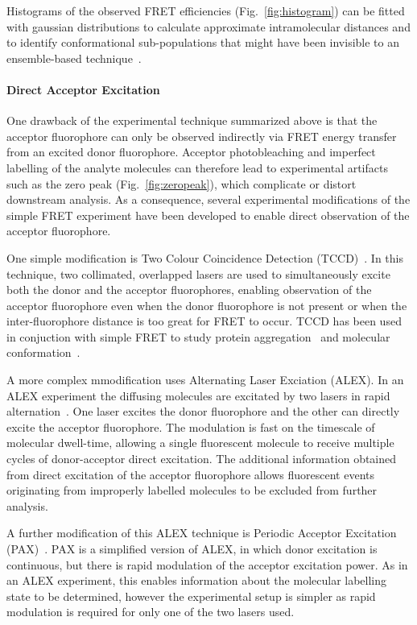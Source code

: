 Histograms of the observed FRET efficiencies (Fig.~\ref{fig:histogram}) can be fitted with gaussian distributions to calculate approximate intramolecular distances and to identify conformational sub-populations that might have been invisible to an ensemble-based technique~\cite{joo08, Walter2008}.

\paragraph{Direct Acceptor Excitation}
One drawback of the experimental technique summarized above is that the acceptor fluorophore can only be observed indirectly via FRET energy transfer from an excited donor fluorophore. Acceptor photobleaching and imperfect labelling of the analyte molecules can therefore lead to experimental artifacts such as the zero peak (Fig.~\ref{fig:zeropeak}), which complicate or distort downstream analysis. As a consequence, several experimental modifications of the simple FRET experiment have been developed to enable direct observation of the acceptor fluorophore.

One simple modification is Two Colour Coincidence Detection (TCCD)~\cite{orte06, orte10}. In this technique, two collimated, overlapped lasers are used to simultaneously excite both the donor and the acceptor fluorophores, enabling observation of the acceptor fluorophore even when the donor fluorophore is not present or when the inter-fluorophore distance is too great for FRET to occur. TCCD has been used in conjuction with simple FRET to study protein aggregation~\cite{cremades2012} and molecular conformation~\cite{Ye2012}.  

A more complex mmodification uses Alternating Laser Exciation (ALEX). In an ALEX experiment the diffusing molecules are excitated by two lasers in rapid alternation~\cite{kapanidis05}. One laser excites the donor fluorophore and the other can directly excite the acceptor fluorophore. The modulation is fast on the timescale of molecular dwell-time, allowing a single fluorescent molecule to receive multiple cycles of donor-acceptor direct excitation. The additional information obtained from direct excitation of the acceptor fluorophore allows fluorescent events originating from improperly labelled molecules to be excluded from further analysis. 

A further modification of this ALEX technique is Periodic Acceptor Excitation (PAX)~\cite{doose07}. PAX is a simplified version of ALEX, in which donor excitation is continuous, but there is rapid modulation of the acceptor excitation power. As in an ALEX experiment, this enables information about the molecular labelling state to be determined, however the experimental setup is simpler as rapid modulation is required for only one of the two lasers used.

